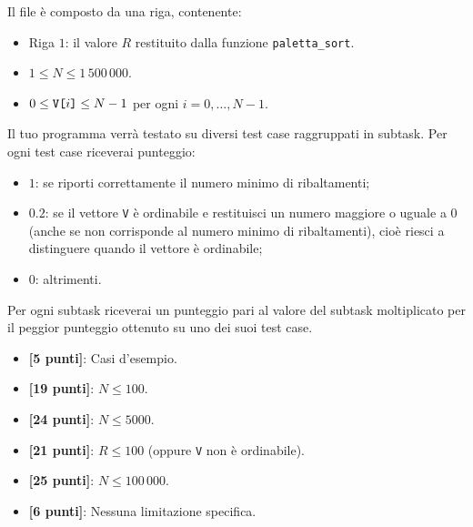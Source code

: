 Il file \outputfile{} è composto da una riga, contenente:
\begin{itemize}[nolistsep,itemsep=2mm]
\item Riga $1$: il valore $R$ restituito dalla funzione \texttt{paletta\_sort}.
\end{itemize}



\Constraints

\begin{itemize}[nolistsep, itemsep=2mm]
	\item $1 \le N \le 1\,500\,000$.
	\item $0 \le \text{\texttt{V[$i$]}} \le N-1$ per ogni $i=0,\ldots, N-1$.
\end{itemize}



\Scoring

Il tuo programma verrà testato su diversi test case raggruppati in subtask. Per ogni test case riceverai punteggio:
\begin{itemize}[nolistsep,itemsep=2mm]
  \item $1$: se riporti correttamente il numero minimo di ribaltamenti;
  \item $0.2$: se il vettore \texttt{V} è ordinabile e restituisci un numero maggiore o uguale a 0 (anche se non corrisponde al numero minimo di ribaltamenti), cioè riesci a distinguere quando il vettore è ordinabile;
  \item $0$: altrimenti.
\end{itemize}
Per ogni subtask riceverai un punteggio pari al valore del subtask moltiplicato per il peggior punteggio ottenuto su uno dei suoi test case.

\begin{itemize}[nolistsep,itemsep=2mm]
  \item \textbf{ [\phantom{0}5 punti]}: Casi d'esempio.
  \item \textbf{ [19 punti]}: $N \leq 100$.
  \item \textbf{ [24 punti]}: $N \leq 5000$.
  \item \textbf{ [21 punti]}: $R \leq 100$ (oppure \texttt{V} non è ordinabile).
  \item \textbf{ [25 punti]}: $N \le 100\,000$.
  \item \textbf{ [\phantom{0}6 punti]}: Nessuna limitazione specifica.
\end{itemize}

